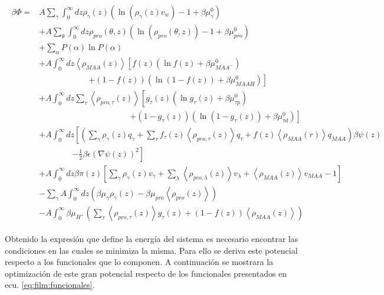 \begin{align}
	\begin{aligned}
		\beta \Phi=  & A\sum_{\gamma}\int_0^\infty{dz\rho_\gamma(z)\left(\ln \left(\rho_\gamma (z)v_w\right) -1 + \beta\mu^0_\gamma\right)} \\
		&+ A\sum_{\theta}\int_0^\infty{dz\rho_{pro}(\theta,z)\left(\ln \left(\rho_{pro}(\theta,z)\right) -1 + \beta\mu^0_{pro} \right)} \\
		&+ \sum_\alpha{P(\alpha)\ln P(\alpha)} \\
		& + A\int_0^\infty dz \left<\rho_{MAA}(z)\right> \left[f(z)(\ln f(z)+ \beta\mu^0_{MAA^-})\right.\\
		& \qquad\qquad\qquad \left.+(1-f(z))(\ln (1-f(z))+\beta\mu^0_{MAAH})\right] \\
		& + A\int_0^\infty dz \sum_\tau \left<\rho_{pro,\tau}(z)\right> \left[g_\tau(z)(\ln g_\tau(z)+ \beta\mu^0_{\tau p})\right.\\
		&\qquad \qquad \qquad\qquad \qquad\quad \left.+(1-g_\tau(z))(\ln (1-g_\tau(z))+\beta\mu^0_{\tau d})\right]   \\
		& +A\int_0^\infty dz \left[\left(\sum_{\gamma } {\rho_\gamma(z) q_\gamma + \sum_\tau{f_\tau(z) \left<\rho_{pro,\tau}(z)\right> q_\tau} +  f(z) \left<\rho_{MAA}(r)\right>q_{MAA}}\right)\beta\psi(z) \right. \\ & \qquad \qquad \left.-\frac{1}{2}\beta\epsilon(\nabla\psi(z))^2 \right] \\ 
		& +A \int_0^\infty dz\beta\pi(z){\left[\sum_{\gamma}\rho_\gamma(z) v_\gamma + \sum_\lambda{\left<\rho_{pro,\lambda}(z)\right>v_\lambda} + \left<\rho_{MAA}(z)\right>v_{MAA} -1 \right]} \\
		&   -\sum_\gamma A\int_0^\infty dz \left(\beta \mu_\gamma \rho_\gamma(z) - \beta \mu_{pro} \left<\rho_{pro}(z)\right> \right)  \\
		&  -A\int_0^\infty \beta\mu_{H^+} \left( \sum_\tau\left< \rho_{pro,\tau}(z) \right>g_\tau(z) + (1-f(z)) \left< \rho_{MAA}(z) \right> \right )
	\end{aligned}
\end{align}
 
Obtenido la expresi\'on que define la energ\'ia del sistema es necesario encontrar las condiciones en las cuales se minimiza la misma. Para ello se deriva este potencial respecto a los funcionales que lo componen.
A continuaci\'on se mostrara la optimizaci\'on de este gran potencial respecto de los funcionales presentados en  ecu. \ref{eq:film:funcionales}.

